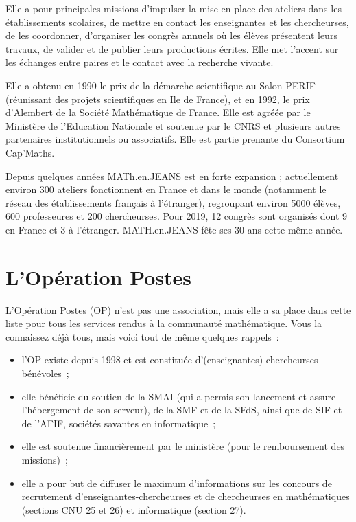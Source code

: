 Elle a pour principales missions d'impulser la mise en place des ateliers dans les \'etablissements scolaires, de mettre en contact les enseignant\mp e\mp s et les chercheur\mp ses, de les coordonner, d'organiser les congr\`es annuels o\`u les \'el\`eves pr\'esentent leurs travaux, de valider et de publier leurs productions \'ecrites. Elle met l'accent sur les \'echanges entre pair\mp e\mp s et le contact avec la recherche vivante.

Elle a obtenu en 1990 le prix de la d\'emarche scientifique au Salon PERIF (r\'eunissant des projets scientifiques en Ile de France), et en 1992, le prix d'Alembert de la Soci\'et\'e Math\'ematique de France. Elle est agr\'e\'ee par le Minist\`ere de l'Education Nationale et soutenue par le CNRS et plusieurs autres partenaires institutionnels ou associatifs. Elle est partie prenante du Consortium Cap'Maths.

Depuis quelques ann\'ees MATh.en.JEANS est en forte expansion ; actuellement environ 300 ateliers fonctionnent en France et dans le monde (notamment le r\'eseau des \'etablissements fran\c{c}ais \`a l'\'etranger), regroupant environ 5000 \'el\`eves, 600 professeur\mp e\mp s et 200 chercheur\mp ses. Pour 2019, 12 congr\`es sont organis\'es dont 9 en France et 3 \`a l'\'etranger. MATH.en.JEANS f\^ete ses 30 ans cette m\^eme ann\'ee.


\section{L'Op\'eration Postes}

L'Op\'eration Postes (OP) n'est pas une association, mais elle a sa
place dans cette liste pour tous les services rendus \`a la
communaut\'e math\'ematique. Vous la connaissez d\'ej\`a tous,
mais voici tout de m\^eme quelques rappels~: 
\begin{itemize}
\item l'OP existe depuis 1998 et est constitu\'ee
d'(enseignant\mp e\mp s)-chercheur\mp ses b\'en\'evoles~;

\item elle b\'en\'eficie du soutien de la SMAI (qui a permis son
lancement et assure l'h\'ebergement de son serveur), de la SMF et de
la SFdS, ainsi que de SIF et de l'AFIF, soci\'et\'es savantes en
informatique~;

\item elle est soutenue financi\`erement par le minist\`ere (pour
le remboursement des missions)~;


\item elle a pour but de diffuser le maximum d'informations sur
les concours de recrutement d'enseignant\mp e\mp s-chercheur\mp ses et de
chercheur\mp ses en math\'ematiques (sections CNU 25 et 26) et
informatique (section 27).
\end{itemize}

